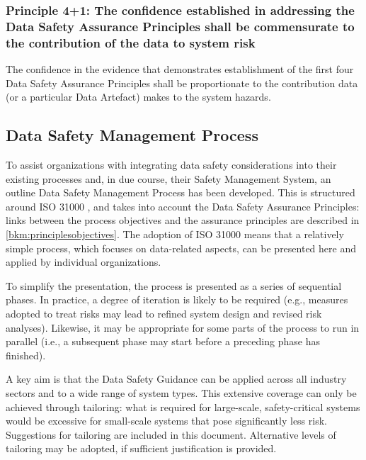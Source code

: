 \subsubsection{Principle 4+1: The confidence established in addressing the Data Safety Assurance Principles shall be commensurate to the contribution of the data to system risk}
The confidence in the evidence that demonstrates establishment of the first four Data Safety Assurance Principles shall be proportionate to the contribution data (or a particular Data Artefact) makes to the system hazards.

\subsection{Data Safety Management Process}
To assist organizations with integrating data safety considerations into their existing processes and, in due course, their Safety Management System, an outline Data Safety Management Process has been developed.
This is structured around
ISO 31000 \cite{citation:iso310002018risk},
and takes into account the Data Safety Assurance Principles: links between the process objectives and the assurance principles are described in \autoref{bkm:principlesobjectives}.
The adoption of ISO 31000 means that a relatively simple process, which focuses on data-related aspects, can be presented here and applied by individual organizations. 

To simplify the presentation, the process is presented as a series of sequential phases. In practice, a degree of iteration is likely to be required (e.g., measures adopted to treat risks may lead to refined system design and revised risk analyses). Likewise, it may be appropriate for some parts of the process to run in parallel (i.e., a subsequent phase may start before a preceding phase has finished).

A key aim is that the Data Safety Guidance can be applied across all industry sectors and to a wide range of system types. This extensive coverage can only be achieved through tailoring: what is required for large-scale, safety-critical systems would be excessive for small-scale systems that pose significantly less risk. Suggestions for tailoring are included in this document. Alternative levels of tailoring may be adopted, if sufficient justification is provided.

